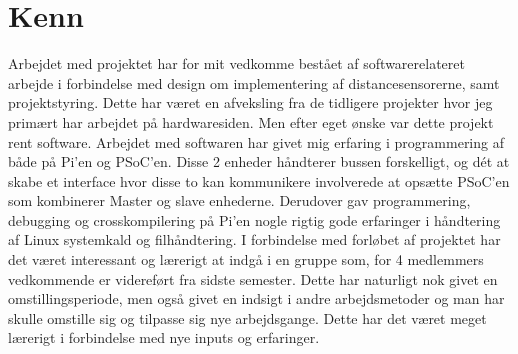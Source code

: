 \section{Kenn}\label{sec:opnaaede_erfaringer_ke}

Arbejdet med projektet har for mit vedkomme bestået af softwarerelateret arbejde i forbindelse med design om implementering af distancesensorerne, samt projektstyring. 
Dette har været en afveksling fra de tidligere projekter hvor jeg primært har arbejdet på hardwaresiden. 
Men efter eget ønske var dette projekt rent software.
Arbejdet med softwaren har givet mig erfaring i programmering af \IIC både på Pi'en og PSoC'en. 
Disse 2 enheder håndterer bussen forskelligt, og dét at skabe et interface hvor disse to kan kommunikere involverede at opsætte PSoC'en som kombinerer Master og slave enhederne. Derudover gav programmering, debugging og crosskompilering på Pi'en nogle rigtig gode erfaringer i håndtering af Linux systemkald og filhåndtering.
I forbindelse med forløbet af projektet har det været interessant og lærerigt at indgå i en gruppe som, for 4 medlemmers vedkommende er videreført fra sidste semester. 
Dette har naturligt nok givet en omstillingsperiode, men også givet en indsigt i andre arbejdsmetoder og man har skulle omstille sig og tilpasse sig nye arbejdsgange. 
Dette har det været meget lærerigt i forbindelse med nye inputs og erfaringer. 